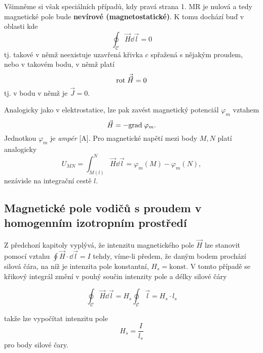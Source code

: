     Všimněme si však speciálních případů, kdy pravá strana 1. MR je nulová a tedy magnetické pole
    bude \textbf{nevírové (magnetostatické)}. K tomu dochází buď v oblasti kde 
    \begin{equation}\label{TEMP:eq_1MR_0}
      \oint_{\mathcal{C}}\vec{H}\dd{\vec{l}} = 0
    \end{equation}    
    tj. takové v němž neexistuje uzavřená křivka $c$ spřažená s nějakým proudem, nebo v takovém
    bodu, v němž platí
    \begin{equation}\label{TEMP:eq_rotH_0}
      \mathrm{rot}\;\vec{\vec{H}} = 0
    \end{equation}
    tj. v bodu v němž je $\vec{J} = 0$.
    
    Analogicky jako v elektrostatice, lze pak zavést magnetický potenciál $\varphi_m$ vztahem  
    \begin{equation}\label{TEMP:eq_grad_varphi_m}
      \vec{H} = - \mathrm{grad\;}\varphi_m.
    \end{equation}              
    Jednotkou $\varphi_m$ je \emph{ampér} [A]. Pro magnetické napětí mezi body $M, N$ platí
    analogicky
    \begin{equation}\label{TEMP:eq_Umn_def}
      U_{MN} = \int_{M(l)}^N\vec{H}\dd{\vec{l}} = \varphi_m(M) - \varphi_m(N),
    \end{equation}        
    nezávisle na integrační cestě $l$. 
     
    \subsection{Magnetické pole vodičů s proudem v homogen\-ním izo\-trop\-ním prostředí}
      Z předchozí kapitoly vyplývá, že intenzitu magnetického pole $\vec{H}$ lze stanovit pomocí
      vztahu $\oint\vec{H}\cdot \dd{\vec{l}} = I$ tehdy, víme-li předem, že daným bodem prochází silová
      čára, na níž je intenzita pole konstantní, $H_s = \text{konst}$. V tomto případě se křikový
      integrál změní v pouhý součin intenzity pole a délky silové čáry
       
      \begin{equation}\label{TEMP:eq_1MR_v_hom_p}
        \oint_{\mathcal{C}}\vec{H}\dd{\vec{l}} = H_s\oint_{\mathcal{C}}\vec{l} = H_s\cdot l_s
      \end{equation}      
       
      takže lze vypočítat intenzitu pole $$H_s = \frac{I}{l_s}$$ pro body silové čary. 
      

